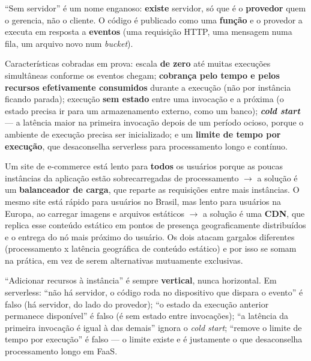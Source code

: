 \begin{conceito}
“Sem servidor” é um nome enganoso: \textbf{existe} servidor, só que é o
\textbf{provedor} quem o gerencia, não o cliente. O código é publicado como
uma \textbf{função} e o provedor a executa em resposta a \textbf{eventos}
(uma requisição HTTP, uma mensagem numa fila, um arquivo novo num
\textit{bucket}).

Características cobradas em prova: escala \textbf{de zero} até muitas
execuções simultâneas conforme os eventos chegam; \textbf{cobrança pelo
tempo e pelos recursos efetivamente consumidos} durante a execução (não
por instância ficando parada); execução \textbf{sem estado} entre uma
invocação e a próxima (o estado precisa ir para um armazenamento externo,
como um banco); \textbf{\textit{cold start}} --- a latência maior na
primeira invocação depois de um período ocioso, porque o ambiente de
execução precisa ser inicializado; e um \textbf{limite de tempo por
execução}, que desaconselha serverless para processamento longo e
contínuo.
\end{conceito}

\begin{exemplo}
Um site de e-commerce está lento para \textbf{todos} os usuários porque as
poucas instâncias da aplicação estão sobrecarregadas de processamento
$\to$ a solução é um \textbf{balanceador de carga}, que reparte as
requisições entre mais instâncias. O mesmo site está rápido para usuários
no Brasil, mas lento para usuários na Europa, ao carregar imagens e
arquivos estáticos $\to$ a solução é uma \textbf{CDN}, que replica esse
conteúdo estático em pontos de presença geograficamente distribuídos e o
entrega do nó mais próximo do usuário. Os dois atacam gargalos diferentes
(processamento x latência geográfica de conteúdo estático) e por isso se
somam na prática, em vez de serem alternativas mutuamente exclusivas.
\end{exemplo}

\begin{cuidado}
“Adicionar recursos à instância” é sempre \textbf{vertical}, nunca
horizontal. Em serverless: “não há servidor, o código roda no dispositivo
que dispara o evento” é falso (há servidor, do lado do provedor); “o
estado da execução anterior permanece disponível” é falso (é sem estado
entre invocações); “a latência da primeira invocação é igual à das
demais” ignora o \textit{cold start}; “remove o limite de tempo por
execução” é falso --- o limite existe e é justamente o que desaconselha
processamento longo em FaaS.
\end{cuidado}

